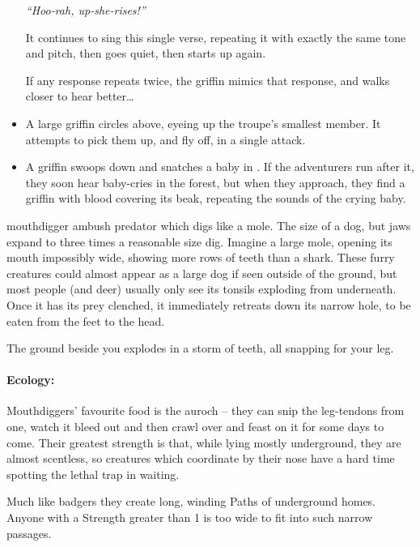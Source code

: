 \begin{multicols}{2}
\begin{itemize}
    \textit{``Hoo-rah, up-she-rises!''}

    It continues to sing this single verse, repeating it with exactly the same tone and pitch, then goes quiet, then starts up again.

    If any response repeats twice, the griffin mimics that response, and walks closer to hear better\ldots
  \fi
  \item
  A large griffin circles above, eyeing up the troupe's smallest member.
  It attempts to pick them up, and fly off, in a single attack.
  \item
  A griffin swoops down and snatches a baby in .
  If the adventurers run after it, they soon hear baby-cries in the forest, but when they approach, they find a griffin with blood covering its beak, repeating the sounds of the crying baby.

\end{itemize}

  {mouthdigger}%
  {ambush predator which digs like a mole.  The size of a dog, but jaws expand to three times a reasonable size}%
dig.
Imagine a large mole, opening its mouth impossibly wide, showing more rows of teeth than a shark.
These furry creatures could almost appear as a large dog if seen outside of the ground, but most people (and deer) usually only see its tonsils exploding from underneath.
Once it has its prey clenched, it immediately retreats down its narrow hole, to be eaten from the feet to the head.

\begin{boxtext}
  The ground beside you explodes in a storm of teeth, all snapping for your leg.
\end{boxtext}

\paragraph{Ecology:} Mouthdiggers' favourite food is the auroch -- they can snip the leg-tendons from one, watch it bleed out and then crawl over and feast on it for some days to come.
Their greatest strength is that, while lying mostly underground, they are almost scentless, so creatures which coordinate by their nose have a hard time spotting the lethal trap in waiting.

Much like badgers they create long, winding Paths of underground homes.  Anyone with a Strength greater than 1 is too wide to fit into such narrow passages.


\end{multicols}
